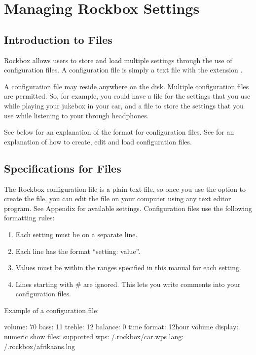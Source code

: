 \section{\label{ref:manage_settings}Managing Rockbox Settings}

\subsection{Introduction to  Files}
Rockbox allows users to store and load multiple settings through the use of
configuration files. A configuration file is simply a text file with the
extension .

A configuration file may reside anywhere on the disk. Multiple
configuration files are permitted. So, for example, you could have
a  file for the settings that you use while playing your
jukebox in your car, and a  file to store the
settings that you use while listening to your \dap{} through headphones.

See  below for an explanation of the format
for configuration files. See  for an
explanation of how to create, edit and load configuration files.

\subsection{\label{ref:cfg_specs}Specifications for  Files}

The Rockbox configuration file is a plain text file, so once you use the
 option to create the file, you can edit the file on
your computer using any text editor program. See
Appendix  for available settings. Configuration
files use the following formatting rules: %

\begin{enumerate}
\item Each setting must be on a separate line.
\item Each line has the format ``setting: value''.
\item Values must be within the ranges specified in this manual for each
  setting.
\item Lines starting with \# are ignored. This lets you write comments into
  your configuration files.
\end{enumerate}

Example of a configuration file:
\begin{example}
    volume: 70
    bass: 11
    treble: 12
    balance: 0
    time format: 12hour
    volume display: numeric
    show files: supported
    wps: /.rockbox/car.wps
    lang: /.rockbox/afrikaans.lng
\end{example}


